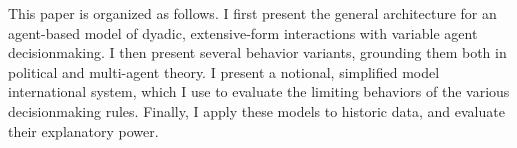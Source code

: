 This paper is organized as follows. I first present the general architecture for an agent-based model of dyadic, extensive-form interactions with variable agent decisionmaking. I then present several behavior variants, grounding them both in political and multi-agent theory. I present a notional, simplified model international system, which I use to evaluate the limiting behaviors of the various decisionmaking rules. Finally, I apply these models to historic data, and evaluate their explanatory power.


